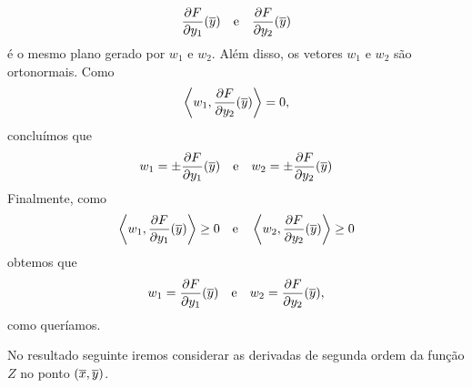 \begin{demonstracao}
\begin{equation*}
	\frac{\partial F}{\partial y_1}(\overline{y}) \quad \text{e} \quad 
	\frac{\partial F}{\partial y_2}(\overline{y})
	\end{equation*}
	é o mesmo plano gerado por $w_1$ e $w_2$. Al\'em disso, os vetores
	$w_1$ e $w_2$ s\~ao ortonormais. Como
	\begin{equation*}
	\left\langle w_1, \frac{\partial F}{\partial y_2}(\overline{y}) \right\rangle = 0,
	\end{equation*}
	conclu\'imos que
	\begin{equation*}
	w_1 = \pm \frac{\partial F}{\partial y_1}(\overline{y}) 
	\quad \text{e} \quad 
	w_2 = \pm \frac{\partial F}{\partial y_2}(\overline{y})
	\end{equation*}
	Finalmente, como
	\begin{equation*}
	\left\langle w_1, \frac{\partial F}{\partial y_1}(\overline{y}) \right\rangle \geq 0 
	\quad \text{e} \quad 
	\left\langle w_2, \frac{\partial F}{\partial y_2}(\overline{y}) \right\rangle \geq 0
	\end{equation*}	
	obtemos que
	\begin{equation*}
	w_1 = \frac{\partial F}{\partial y_1}(\overline{y}) \quad \text{e} \quad 
	w_2 = \frac{\partial F}{\partial y_2}(\overline{y}),
	\end{equation*}
	como quer\'iamos.
\end{demonstracao}

No resultado seguinte iremos considerar as derivadas de segunda
ordem da fun\c c\~ao $Z$ no ponto $(\overline{x},\overline{y})$.


